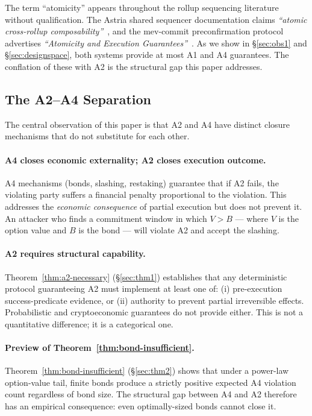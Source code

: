 \noindent The term ``atomicity'' appears throughout the rollup sequencing
literature without qualification. The Astria shared sequencer documentation
claims \emph{``atomic cross-rollup composability''}~\cite{Astria-README},
and the mev-commit preconfirmation protocol advertises \emph{``Atomicity
and Execution Guarantees''}~\cite{MevCommit-Marketing}. As we show in
\S\ref{sec:obs1} and \S\ref{sec:designspace}, both systems provide at most
A1 and A4 guarantees. The conflation of these with A2 is the structural
gap this paper addresses.

\subsection{The A2--A4 Separation}
\label{sec:a2a4}

The central observation of this paper is that A2 and A4 have distinct
closure mechanisms that do not substitute for each other.

\paragraph{A4 closes economic externality; A2 closes execution outcome.}
A4 mechanisms (bonds, slashing, restaking) guarantee that if A2 fails, the
violating party suffers a financial penalty proportional to the violation.
This addresses the \emph{economic consequence} of partial execution but
does not prevent it. An attacker who finds a commitment window in which
$V > B$ --- where $V$ is the option value and $B$ is the bond --- will violate
A2 and accept the slashing.

\paragraph{A2 requires structural capability.}
Theorem~\ref{thm:a2-necessary} (\S\ref{sec:thm1}) establishes that any
deterministic protocol guaranteeing A2 must implement at least one of:
(i) pre-execution success-predicate evidence, or (ii) authority to prevent
partial irreversible effects. Probabilistic and cryptoeconomic guarantees
do not provide either. This is not a quantitative difference; it is a
categorical one.

\paragraph{Preview of Theorem~\ref{thm:bond-insufficient}.}
Theorem~\ref{thm:bond-insufficient} (\S\ref{sec:thm2}) shows that under
a power-law option-value tail, finite bonds produce a strictly positive
expected A4 violation count regardless of bond size. The structural gap
between A4 and A2 therefore has an empirical consequence: even
optimally-sized bonds cannot close it.


